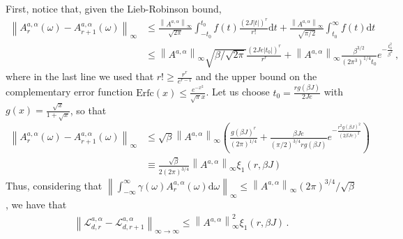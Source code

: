 \documentclass[aps,pra,amsmath,amssymb,twocolumn,10pt]{revtex4-2}
\theoremstyle{definition}
\newcommand{\norm}[1]{\left\|#1\right\|}
\begin{document}
First, notice that, given the Lieb-Robinson bound, 
\begin{align}
	\norm{A^{a,\alpha}_r(\omega) - A^{a,\alpha}_{r+1}(\omega)}_\infty &\le  \frac{\norm{A^{a,\alpha}}_\infty}{\sqrt{2 \pi}} \int_{-t_0}^{t_0} f(t) \frac{(2 J \vert t \vert )^r}{r!} \text{d} t +  \frac{\norm{A^{a,\alpha}}_\infty}{\sqrt{\pi/2}} \int_{t_0}^\infty  f(t) \text{d} t
	\\ & \le \norm{A^{a,\alpha}}_\infty \sqrt{\beta / \sqrt{2 \pi} } \frac{(2 J e  \vert t_0 \vert )^r}{r^{r}} +  \norm{A^{a,\alpha}}_\infty \frac{\beta^{3/2}}{(2 \pi^3)^{1/4} t_0} e^{-\frac{t_0^2}{\beta^2}}\,,
\end{align}
where in the last line we used that $r! \ge \frac{r^r}{e^{r-1}}$ and the upper bound on the complementary error function $\text{Erfc}(x) \le \frac{e^{-x^2}}{\sqrt{\pi}x}$.
Let us choose $t_0 = \frac{r g(\beta J)} {2J e}$ with $g(x)=\frac{\sqrt{x}}{1+\sqrt{x}}$, so that
\begin{align}
	\norm{A^{a,\alpha}_r(\omega) - A^{a,\alpha}_{r+1}(\omega)}_\infty &\le \sqrt{\beta} \norm{A^{a,\alpha}}_\infty \left ( \frac{g(\beta J)^r}{ (2 \pi)^{1/4} } +  \frac{  \beta J e }{( \pi/2)^{3/4} r g(\beta J)} e^{-\frac{r^2 g(\beta J)^2}{(2 \beta J e )^2}} \right) \\ & \equiv \frac{\sqrt{\beta}}{ 2 (2 \pi)^{3/4} } \norm{A^{a,\alpha}}_\infty  \xi_1(r,\beta J)
\end{align}
Thus, considering that $\norm{\int_{-\infty}^{\infty} \gamma (\omega) A^{a,\alpha}_r(\omega)  \text{d} \omega}_\infty \le \norm{A^{a,\alpha}}_\infty (2 \pi)^{3/4} /\sqrt{\beta}  $, we have that 
\begin{align}
	\norm{  \mathcal{L}^{a,\alpha}_{d,r}-\mathcal{L}^{a,\alpha}_{d,r+1} }_{\infty\to\infty} \le  \norm{A^{a,\alpha}}_\infty^2  \xi_1(r,\beta J)\,.
\end{align}
\end{document}
